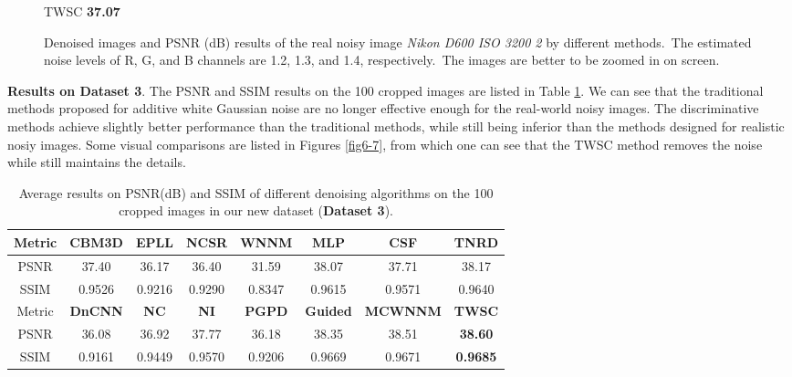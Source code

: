 \begin{figure}
{\begin{minipage}[t]{0.24\textwidth}
{\footnotesize TWSC \textbf{37.07}}
\end{minipage}
}
    \caption{Denoised images and PSNR (dB) results of the real noisy image \textsl{Nikon D600 ISO 3200 2} \cite{crosschannel2016} by different methods.\ The estimated noise levels of R, G, and B channels are 1.2, 1.3, and 1.4, respectively.\ The images are better to be zoomed in on screen.}
    \label{fig6-6}
\end{figure}

\textbf{Results on Dataset 3}.
The PSNR and SSIM \cite{ssim} results on the 100 cropped images are listed in Table \ref{tab6-8}. We can see that the traditional methods proposed for additive white Gaussian noise are no longer effective enough for the real-world noisy images. The discriminative methods achieve slightly better performance than the traditional methods, while still being inferior than the methods designed for realistic nosiy images. Some visual comparisons are listed in Figures \ref{fig6-7}, from which one can see that the TWSC method removes the noise while still maintains the details. 

\begin{table}[hbp]
\caption{Average results on PSNR(dB) and SSIM of different denoising algorithms on the 100 cropped images in our new dataset (\textbf{Dataset 3}).}
\scriptsize
\label{tab6-8}
\begin{center}
\renewcommand\arraystretch{1.2}
\begin{tabular*}{1\textwidth}{@{\extracolsep{\fill}}cccccccc}
\hline
Metric
&
\textbf{CBM3D}
&
\textbf{EPLL}
&
\textbf{NCSR}
&
\textbf{WNNM}
&
\textbf{MLP}
&
\textbf{CSF}
&
\textbf{TNRD}
\\
\hline
PSNR & 37.40 & 36.17 & 36.40 & 31.59 & 38.07 & 37.71 & 38.17 
\\
\hline
SSIM & 0.9526 & 0.9216 & 0.9290 & 0.8347 & 0.9615 & 0.9571 & 0.9640
\\
\hline
Metric
&
\textbf{DnCNN}
&
\textbf{NC}
&
\textbf{NI}
&
\textbf{PGPD}
&
\textbf{Guided}
&
\textbf{MCWNNM}
&
\textbf{TWSC}
\\
\hline
PSNR & 36.08 & 36.92  &  37.77 & 36.18 & 38.35 & 38.51 & \textbf{38.60}
\\
\hline
SSIM & 0.9161 & 0.9449  & 0.9570  & 0.9206 & 0.9669 & 0.9671 & \textbf{0.9685}
\\
\hline
\end{tabular*}
\end{center}
\end{table}


